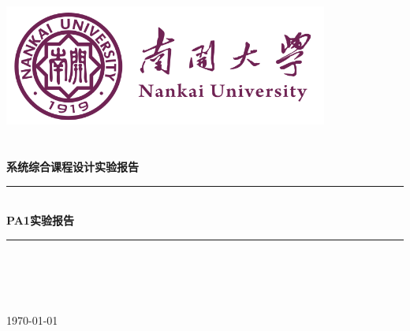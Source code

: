 \documentclass[UTF8,a4paper,10pt]{ctexart}
\newcommand{\kt}{\CJKfamily{kt}}
\newcommand{\sihao}{\fontsize{14pt}{21pt}\selectfont}            %
\newcommand{\HRule}{\rule{\linewidth}{0.5mm}}%
\begin{document}
\begin{titlepage}
    \begin{center}
    \includegraphics[width=0.8\textwidth]{fig/NKU.png}\\[1cm]    
    \textsc{\Huge {} }\\[0.9cm]
    \textsc{\huge {}}\\[0.5cm]
    \textsc{\Large \textbf{系统综合课程设计实验报告}}\\[0.8cm]
    \HRule \\[0.9cm]
    { \LARGE \bfseries PA1实验报告}\\[0.4cm]
    \HRule \\[2.0cm]
    \centering
    \textsc{\LARGE {}}\\[0.5cm]
    \textsc{\LARGE {}}\\[0.5cm]
    \textsc{\LARGE {}}\\[0.5cm]
    \vfill
    {\Large \today}
    \end{center}
\end{titlepage}

\tableofcontents
\newpage
\setcounter{page}{1}
\end{document}
